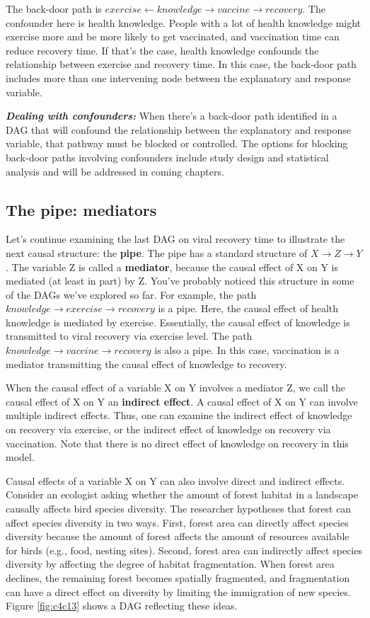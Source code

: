 \documentclass[
]{book}
\begin{document}
The back-door path is \(exercise \gets knowledge \to vaccine \to recovery\). The confounder here is health knowledge. People with a lot of health knowledge might exercise more and be more likely to get vaccinated, and vaccination time can reduce recovery time. If that's the case, health knowledge confounds the relationship between exercise and recovery time. In this case, the back-door path includes more than one intervening node between the explanatory and response variable.

\textbf{\emph{Dealing with confounders:}} When there's a back-door path identified in a DAG that will confound the relationship between the explanatory and response variable, that pathway must be blocked or controlled. The options for blocking back-door paths involving confounders include study design and statistical analysis and will be addressed in coming chapters.

\subsection{The pipe: mediators}\label{the-pipe-mediators}

Let's continue examining the last DAG on viral recovery time to illustrate the next causal structure: the \textbf{pipe}. The pipe has a standard structure of \(X \to Z \to Y\). The variable Z is called a \textbf{mediator}, because the causal effect of X on Y is mediated (at least in part) by Z. You've probably noticed this structure in some of the DAGs we've explored so far. For example, the path \(knowledge \to exercise \to recovery\) is a pipe. Here, the causal effect of health knowledge is mediated by exercise. Essentially, the causal effect of knowledge is transmitted to viral recovery via exercise level. The path \(knowledge \to vaccine \to recovery\) is also a pipe. In this case, vaccination is a mediator transmitting the causal effect of knowledge to recovery.

When the causal effect of a variable X on Y involves a mediator Z, we call the causal effect of X on Y an \textbf{indirect effect}. A causal effect of X on Y can involve multiple indirect effects. Thus, one can examine the indirect effect of knowledge on recovery via exercise, or the indirect effect of knowledge on recovery via vaccination. Note that there is no direct effect of knowledge on recovery in this model.

Causal effects of a variable X on Y can also involve direct and indirect effects. Consider an ecologist asking whether the amount of forest habitat in a landscape causally affects bird species diversity. The researcher hypotheses that forest can affect species diversity in two ways. First, forest area can directly affect species diversity because the amount of forest affects the amount of resources available for birds (e.g., food, nesting sites). Second, forest area can indirectly affect species diversity by affecting the degree of habitat fragmentation. When forest area declines, the remaining forest becomes spatially fragmented, and fragmentation can have a direct effect on diversity by limiting the immigration of new species. Figure \ref{fig:c4c13} shows a DAG reflecting these ideas.
\end{document}
